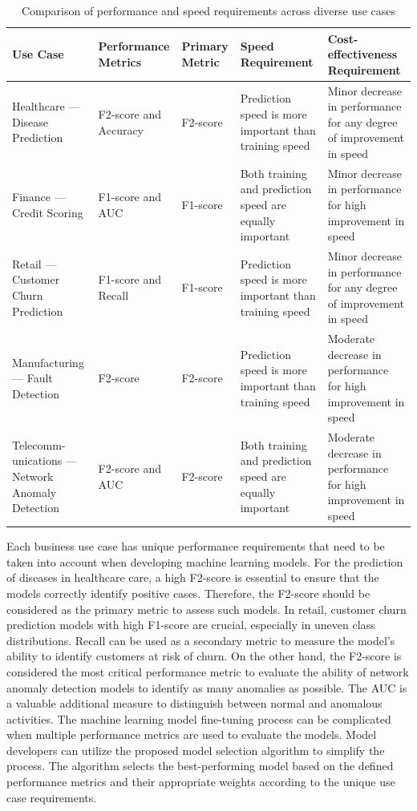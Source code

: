 \begin{table}[!ht]
    \centering
    \caption{Comparison of performance and speed requirements across diverse use cases}
    \begin{tabularx}{\textwidth}{|C|C|C|C|C|}
    \hline
        \textbf{Use Case} & \textbf{Performance Metrics} & \textbf{Primary Metric} &  \textbf{Speed Requirement} & \textbf{Cost-effectiveness Requirement} \\ \hline
        Healthcare --- Disease Prediction & F2-score and Accuracy & F2-score & Prediction speed is more important than training speed & Minor decrease in performance for any degree of improvement in speed \\ \hline
        Finance --- Credit Scoring & F1-score and AUC & F1-score & Both training and prediction speed are equally important & Minor decrease in performance for high improvement in speed \\ \hline
        Retail --- Customer Churn Prediction & F1-score and Recall & F1-score & Prediction speed is more important than training speed & Minor decrease in performance for any degree of improvement in speed \\ \hline
        Manufacturing --- Fault Detection & F2-score & F2-score & Prediction speed is more important than training speed & Moderate decrease in performance for high improvement in speed \\ \hline
        Telecomm-unications --- Network Anomaly Detection & F2-score and AUC & F2-score & Both training and prediction speed are equally important & Moderate decrease in performance for high improvement in speed \\ \hline
    \end{tabularx}
    \label{table:selection-algorithm-usecases}
\end{table}

Each business use case has unique performance requirements that need to be taken into account when developing machine learning models. For the prediction of diseases in healthcare care, a high F2-score is essential to ensure that the models correctly identify positive cases. Therefore, the F2-score should be considered as the primary metric to assess such models. In retail, customer churn prediction models with high F1-score are crucial, especially in uneven class distributions. Recall can be used as a secondary metric to measure the model's ability to identify customers at risk of churn. On the other hand, the F2-score is considered the most critical performance metric to evaluate the ability of network anomaly detection models to identify as many anomalies as possible. The AUC is a valuable additional measure to distinguish between normal and anomalous activities. The machine learning model fine-tuning process can be complicated when multiple performance metrics are used to evaluate the models. Model developers can utilize the proposed model selection algorithm to simplify the process. The algorithm selects the best-performing model based on the defined performance metrics and their appropriate weights according to the unique use case requirements.

